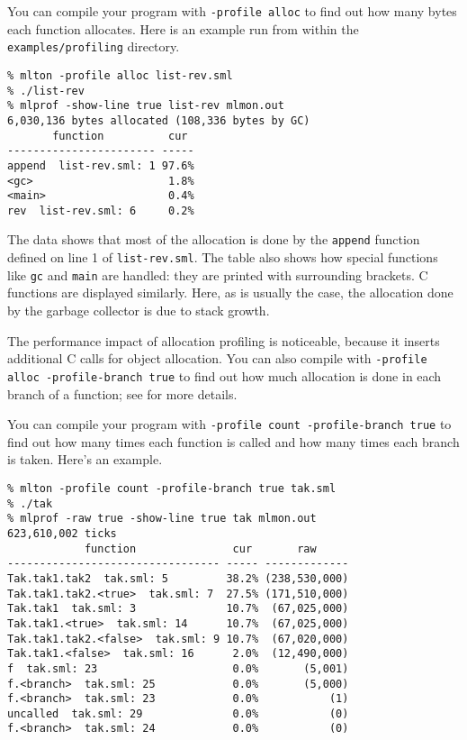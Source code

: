 You can compile your program with {\tt -profile alloc} to find out how
many bytes each function allocates.  Here is an example run from
within the {\tt examples/profiling} directory.
\begin{verbatim}
% mlton -profile alloc list-rev.sml
% ./list-rev
% mlprof -show-line true list-rev mlmon.out
6,030,136 bytes allocated (108,336 bytes by GC)
       function          cur 
----------------------- -----
append  list-rev.sml: 1 97.6%
<gc>                     1.8%
<main>                   0.4%
rev  list-rev.sml: 6     0.2%
\end{verbatim}
%
The data shows that most of the allocation is done by the {\tt append}
function defined on line 1 of {\tt list-rev.sml}.  The table also
shows how special functions like {\tt gc} and {\tt main} are handled:
they are printed with surrounding brackets.  C functions are displayed
similarly.  Here, as is usually the case, the allocation done by the
garbage collector is due to stack growth.

The performance impact of allocation profiling is noticeable, because
it inserts additional C calls for object allocation.  You can also
compile with {\tt -profile alloc -profile-branch true} to find out how
much allocation is done in each branch of a function; see
 for more details.

%
You can compile your program with {\tt -profile count -profile-branch
true} to find out how many times each function is called and how many
times each branch is taken.  Here's an example.

\begin{verbatim}
% mlton -profile count -profile-branch true tak.sml
% ./tak
% mlprof -raw true -show-line true tak mlmon.out
623,610,002 ticks
            function               cur       raw     
--------------------------------- ----- -------------
Tak.tak1.tak2  tak.sml: 5         38.2% (238,530,000)
Tak.tak1.tak2.<true>  tak.sml: 7  27.5% (171,510,000)
Tak.tak1  tak.sml: 3              10.7%  (67,025,000)
Tak.tak1.<true>  tak.sml: 14      10.7%  (67,025,000)
Tak.tak1.tak2.<false>  tak.sml: 9 10.7%  (67,020,000)
Tak.tak1.<false>  tak.sml: 16      2.0%  (12,490,000)
f  tak.sml: 23                     0.0%       (5,001)
f.<branch>  tak.sml: 25            0.0%       (5,000)
f.<branch>  tak.sml: 23            0.0%           (1)
uncalled  tak.sml: 29              0.0%           (0)
f.<branch>  tak.sml: 24            0.0%           (0)
\end{verbatim}

